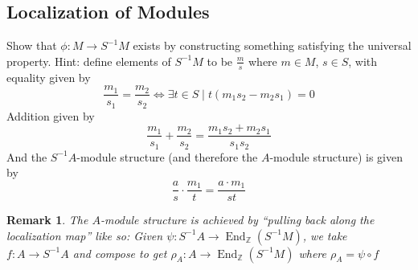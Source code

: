 \documentclass[hidelinks,12pt]{article}
\newtheorem*{remark}{Remark}
\newcommand{\Z}{\mathbb{Z}}
\newcommand{\End}{\operatorname{End}}
\begin{document}
\subsection{Localization of Modules} Show that \(\phi:M\to S^{-1}M\) exists by constructing something satisfying the universal property. Hint: define elements of \(S^{-1}M\) to be \(\frac{m}{s}\) where \(m\in M\), \(s\in S\), with equality given by \[
    \frac{m_{1}}{s_{1}}=\frac{m_{2}}{s_{2}}\iff\exists t\in S\mid t(m_{1}s_{2}-m_{2}s_{1})=0
\]
Addition given by \[
    \frac{m_{1}}{s_{1}}+\frac{m_{2}}{s_{2}}=\frac{m_{1}s_{2}+m_{2}s_{1}}{s_{1}s_{2}}
\]
And the \(S^{-1}A\)-module structure (and therefore the \(A\)-module structure) is given by \[
    \frac{a}{s}\cdot \frac{m_{1}}{t}= \frac{a\cdot m_{1}}{st}
\]
\begin{remark}
    The \(A\)-module structure is achieved by ``pulling back along the localization map'' like so: Given \(\psi:S^{-1}A\to\End_{\Z}(S^{-1}M)\), we take \(f:A\to S^{-1}A\) and compose to get \(\rho_{A}:A\to\End_{\Z}(S^{-1}M)\) where \(\rho_{A}=\psi\circ f\)
\end{remark}
\end{document}
